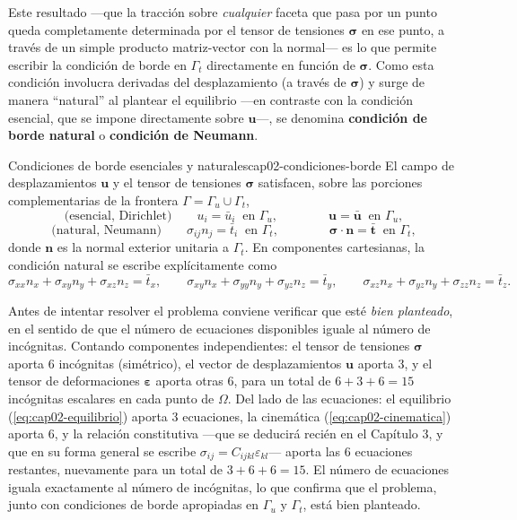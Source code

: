Este resultado —que la tracción sobre \emph{cualquier} faceta que pasa por un punto queda completamente determinada por el tensor de tensiones $\bm\sigma$ en ese punto, a través de un simple producto matriz-vector con la normal— es lo que permite escribir la condición de borde en $\Gamma_t$ directamente en función de $\bm\sigma$. Como esta condición involucra derivadas del desplazamiento (a través de $\bm\sigma$) y surge de manera ``natural'' al plantear el equilibrio —en contraste con la condición esencial, que se impone directamente sobre $\bm u$—, se denomina \textbf{condición de borde natural} o \textbf{condición de Neumann}.

\begin{ecnimportante}{Condiciones de borde esenciales y naturales}{cap02-condiciones-borde}
El campo de desplazamientos $\bm u$ y el tensor de tensiones $\bm\sigma$ satisfacen, sobre las porciones complementarias de la frontera $\Gamma=\Gamma_u\cup\Gamma_t$,
\[
\text{(esencial, Dirichlet)} \qquad u_i = \bar u_i \ \text{ en } \Gamma_u, \qquad\qquad \bm u = \bar{\bm u} \ \text{ en } \Gamma_u,
\]
\[
\text{(natural, Neumann)} \qquad \sigma_{ij}n_j = \bar t_i \ \text{ en } \Gamma_t, \qquad\qquad \bm\sigma\cdot\bm n = \bar{\bm t} \ \text{ en } \Gamma_t,
\]
donde $\bm n$ es la normal exterior unitaria a $\Gamma_t$. En componentes cartesianas, la condición natural se escribe explícitamente como
\[
\sigma_{xx}n_x + \sigma_{xy}n_y + \sigma_{xz}n_z = \bar t_x, \qquad
\sigma_{xy}n_x + \sigma_{yy}n_y + \sigma_{yz}n_z = \bar t_y, \qquad
\sigma_{xz}n_x + \sigma_{yz}n_y + \sigma_{zz}n_z = \bar t_z.
\]
\end{ecnimportante}

\begin{observacion}
Antes de intentar resolver el problema conviene verificar que esté \emph{bien planteado}, en el sentido de que el número de ecuaciones disponibles iguale al número de incógnitas. Contando componentes independientes: el tensor de tensiones $\bm\sigma$ aporta 6 incógnitas (simétrico), el vector de desplazamientos $\bm u$ aporta 3, y el tensor de deformaciones $\bm\varepsilon$ aporta otras 6, para un total de $6+3+6=15$ incógnitas escalares en cada punto de $\Omega$. Del lado de las ecuaciones: el equilibrio (\cref{eq:cap02-equilibrio}) aporta 3 ecuaciones, la cinemática (\cref{eq:cap02-cinematica}) aporta 6, y la relación constitutiva —que se deducirá recién en el Capítulo 3, y que en su forma general se escribe $\sigma_{ij}=C_{ijkl}\varepsilon_{kl}$— aporta las 6 ecuaciones restantes, nuevamente para un total de $3+6+6=15$. El número de ecuaciones iguala exactamente al número de incógnitas, lo que confirma que el problema, junto con condiciones de borde apropiadas en $\Gamma_u$ y $\Gamma_t$, está bien planteado.
\end{observacion}

